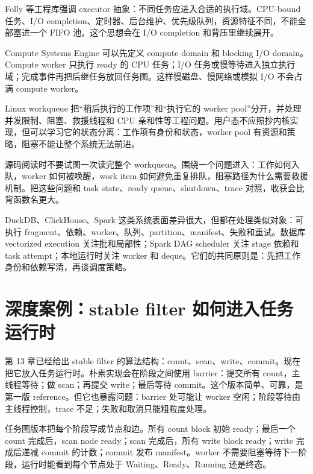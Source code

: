 \begin{casebox}
Folly 等工程库强调 executor 抽象：不同任务应进入合适的执行域。CPU-bound 任务、I/O completion、定时器、后台维护、优先级队列，资源特征不同，不能全部塞进一个 FIFO 池。这个思想会在 I/O completion 和背压里继续展开。

Compute Systems Engine 可以先定义 compute domain 和 blocking I/O domain。Compute worker 只执行 ready 的 CPU 任务；I/O 任务或慢等待进入独立执行域；完成事件再把后继任务放回任务图。这样慢磁盘、慢网络或模拟 I/O 不会占满 compute worker。
\end{casebox}

\begin{casebox}
Linux workqueue 把“稍后执行的工作项”和“执行它的 worker pool”分开，并处理并发限制、阻塞、救援线程和 CPU 亲和性等工程问题。用户态不应照抄内核实现，但可以学习它的状态分离：工作项有身份和状态，worker pool 有资源和策略，阻塞不能让整个系统无法前进。

源码阅读时不要试图一次读完整个 workqueue。围绕一个问题进入：工作如何入队，worker 如何被唤醒，work item 如何避免重复排队，阻塞路径为什么需要救援机制。把这些问题和 task state、ready queue、shutdown、trace 对照，收获会比背函数名更大。
\end{casebox}

DuckDB、ClickHouse、Spark 这类系统表面差异很大，但都在处理类似对象：可执行 fragment、依赖、worker、队列、partition、manifest、失败和重试。数据库 vectorized execution 关注批和局部性；Spark DAG scheduler 关注 stage 依赖和 task attempt；本地运行时关注 worker 和 deque。它们的共同原则是：先把工作身份和依赖写清，再谈调度策略。

\section{深度案例：stable filter 如何进入任务运行时}

第 13 章已经给出 stable filter 的算法结构：count、scan、write、commit。现在把它放入任务运行时。朴素实现会在阶段之间使用 barrier：提交所有 count，主线程等待；做 scan；再提交 write；最后等待 commit。这个版本简单、可靠，是第一版 reference。但它也暴露问题：barrier 处可能让 worker 空闲；阶段等待由主线程控制，trace 不足；失败和取消只能粗粒度处理。

任务图版本把每个阶段写成节点和边。所有 count block 初始 ready；最后一个 count 完成后，scan node ready；scan 完成后，所有 write block ready；write 完成后递减 commit 的计数；commit 发布 manifest。worker 不需要阻塞等待下一阶段，运行时能看到每个节点处于 Waiting、Ready、Running 还是终态。

